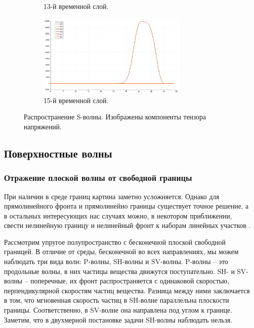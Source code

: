 \begin{figure}[htp]
\begin{subfigure}[b]{0.5\textwidth}
\caption{13-й временной слой.}
\end{subfigure}
\begin{subfigure}[b]{0.5\textwidth}
\centering
\includegraphics[width=0.8\textwidth]{png/s-wave-test/s/0015.png}
\caption{15-й временной слой.}
\end{subfigure}
\caption{Распространение S-волны. Изображены компоненты тензора напряжений.}
\label{pic:s_wave}
\end{figure}


\clearpage
\newpage


\subsection{Поверхностные волны}

\subsubsection{Отражение плоской волны от свободной границы}

При наличии в среде границ картина заметно усложняется. Однако для прямолинейного фронта и прямолинейно границы существует точное решение, а в остальных интересующих нас случаях можно, в некотором приближении, свести нелинейную границу и нелинейный фронт к наборам линейных участков \cite{aki_richards}.

Рассмотрим упругое полупространство с бесконечной плоской свободной границей. В отличие от среды, бесконечной во всех направлениях, мы можем наблюдать три вида волн: P-волны, SH-волны и SV-волны. P-волны – это продольные волны, в них частицы вещества движутся поступательно. SH- и SV-волны – поперечные, их фронт распространяется с одинаковой скоростью, перпендикулярной  скоростям частиц вещества. Разница между ними заключается в том, что мгновенная скорость частиц в SH-волне параллельна плоскости границы. Соответственно, в SV-волне она направлена под углом к границе. Заметим, что в двухмерной постановке задачи SH-волны наблюдать нельзя.

